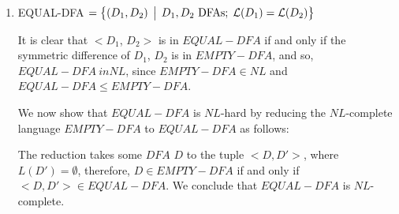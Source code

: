 \documentclass[12pt]{article}
\begin{document}
\begin{enumerate}
\vspace*{.1in}

\item EQUAL-DFA $ =  \bigl\{ (D_1,D_2) \,\bigm|\, D_1,D_2 \mbox{ DFAs};\;{\cal L}(D_1) ={\cal L}(D_2) \bigr\}$

It is clear that $< D_1$, $D_2 >$ is in $EQUAL-DFA$ if and only if the symmetric difference of $D_1$, $D_2$ is in $EMPTY-DFA$, and so, $EQUAL-DFA \ in NL$, since $EMPTY-DFA \in NL$ and $EQUAL-DFA \leq EMPTY-DFA$.

We now show that $EQUAL-DFA$ is $NL$-hard by reducing the $NL$-complete language $EMPTY-DFA$ to $EQUAL-DFA$ as follows:

The reduction takes some $DFA$ $D$ to the tuple $< D, D'>$, where $L(D') = \emptyset$, therefore, $D \in EMPTY-DFA$ if and only if $<D, D'> \in EQUAL-DFA$. We conclude that $EQUAL-DFA$ is $NL$-complete.

\end{enumerate}
\end{document}
